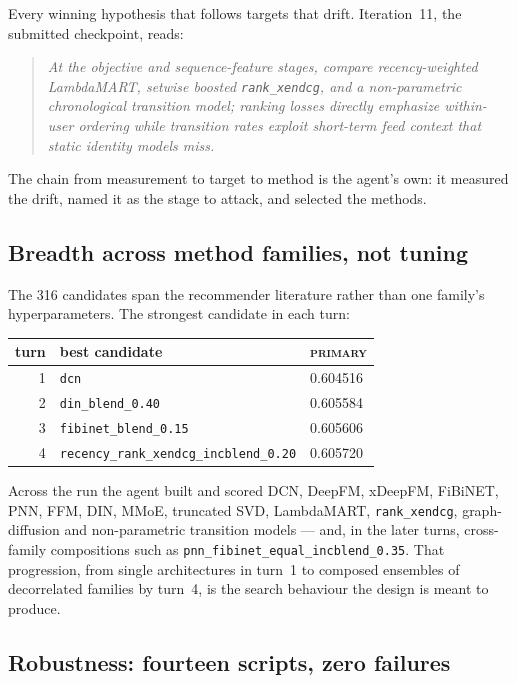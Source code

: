 \documentclass[11pt,a4paper]{article}
\newcommand{\code}[1]{\texttt{#1}}
\newcommand{\primary}{\textsc{primary}}
\begin{document}
Every winning hypothesis that follows targets that drift. Iteration~11, the submitted
checkpoint, reads:

\begin{quote}\small\itshape
At the objective and sequence-feature stages, compare recency-weighted LambdaMART, setwise
boosted \code{rank\_xendcg}, and a non-parametric chronological transition model; ranking losses
directly emphasize within-user ordering while transition rates exploit short-term feed context
that static identity models miss.
\end{quote}

\noindent
The chain from measurement to target to method is the agent's own: it measured the drift, named
it as the stage to attack, and selected the methods.

\subsection{Breadth across method families, not tuning}

The 316 candidates span the recommender literature rather than one family's hyperparameters.
The strongest candidate in each turn:

\begin{center}
\small
\begin{tabular}{@{}rll@{}}
\toprule
\textbf{turn} & \textbf{best candidate} & \textbf{\primary} \\
\midrule
1 & \code{dcn}                          & 0.604516 \\
2 & \code{din\_blend\_0.40}              & 0.605584 \\
3 & \code{fibinet\_blend\_0.15}          & 0.605606 \\
4 & \code{recency\_rank\_xendcg\_incblend\_0.20} & 0.605720 \\
\bottomrule
\end{tabular}
\end{center}

\noindent
Across the run the agent built and scored DCN, DeepFM, xDeepFM, FiBiNET, PNN, FFM, DIN, MMoE,
truncated SVD, LambdaMART, \code{rank\_xendcg}, graph-diffusion and non-parametric transition
models --- and, in the later turns, cross-family compositions such as
\code{pnn\_fibinet\_equal\_incblend\_0.35}. That progression, from single architectures in
turn~1 to composed ensembles of decorrelated families by turn~4, is the search behaviour the
design is meant to produce.

\subsection{Robustness: fourteen scripts, zero failures}
\end{document}

